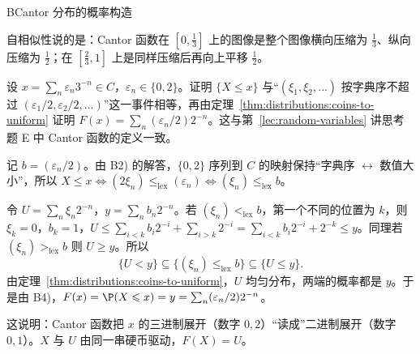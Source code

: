 \begin{probleme}{B}{Cantor 分布的概率构造}
\begin{questions}
\begin{solution}
自相似性说的是：Cantor 函数在 $[0,\frac13]$ 上的图像是整个图像横向压缩为 $\frac13$、纵向压缩为 $\frac12$；在 $[\frac23,1]$ 上是同样压缩后再向上平移 $\frac12$。
\end{solution}
\item 设 $x=\sum_n\varepsilon_n3^{-n}\in C$，$\varepsilon_n\in\{0,2\}$。证明 $\{X\leqslant x\}$ 与“$(\xi_1,\xi_2,\dots)$ 按字典序不超过 $(\varepsilon_1/2,\varepsilon_2/2,\dots)$”这一事件相等，再由定理~\ref{thm:distributions:coins-to-uniform} 证明 $F(x)=\sum_n(\varepsilon_n/2)2^{-n}$。这与第~\ref{lec:random-variables} 讲思考题 E 中 Cantor 函数的定义一致。
\begin{solution}
记 $b=(\varepsilon_n/2)$。由 B2) 的解答，$\{0,2\}$ 序列到 $C$ 的映射保持“字典序 $\leftrightarrow$ 数值大小”，所以 $X\leqslant x\iff(2\xi_n)\leqslant_{\mathrm{lex}}(\varepsilon_n)\iff(\xi_n)\leqslant_{\mathrm{lex}}b$。

令 $U=\sum_n\xi_n2^{-n}$，$y=\sum_nb_n2^{-n}$。若 $(\xi_n)<_{\mathrm{lex}}b$，第一个不同的位置为 $k$，则 $\xi_k=0$，$b_k=1$，$U\leqslant\sum_{i<k}b_i2^{-i}+\sum_{i>k}2^{-i}=\sum_{i<k}b_i2^{-i}+2^{-k}\leqslant y$。同理若 $(\xi_n)>_{\mathrm{lex}}b$ 则 $U\geqslant y$。所以
\[
\{U<y\}\subseteq\{(\xi_n)\leqslant_{\mathrm{lex}}b\}\subseteq\{U\leqslant y\}.
\]
由定理~\ref{thm:distributions:coins-to-uniform}，$U$ 均匀分布，两端的概率都是 $y$。于是由 B4)，$F(x)=\P(X\leqslant x)=y=\sum_n(\varepsilon_n/2)2^{-n}$。

这说明：Cantor 函数把 $x$ 的三进制展开（数字 $0,2$）“读成”二进制展开（数字 $0,1$）。$X$ 与 $U$ 由同一串硬币驱动，$F(X)=U$。
\end{solution}
\end{questions}
\end{probleme}

